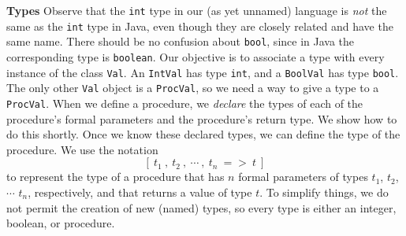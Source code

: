 \begin{minipage}[t]{\sw}
\slidenumber
\LARGE
{\bf Types}\exx
Observe that the \verb'int' type in our (as yet unnamed) language
is {\em not} the same as the \verb'int' type in Java,
even though they are closely related and have the same name.
There should be no confusion about \verb'bool', 
since in Java the corresponding type is \verb'boolean'.\exx
Our objective is to associate a type
with every instance of the class \verb'Val'.
An \verb'IntVal' has type \verb'int',
and a \verb'BoolVal' has type \verb'bool'.
The only other \verb'Val' object is a \verb'ProcVal',
so we need a way to give a type to a \verb'ProcVal'.\exx
When we define a procedure, we {\em declare} the types
of each of the procedure's formal parameters
and the procedure's return type.
We show how to do this shortly.
Once we know these declared types,
we can define the type of the procedure.\exx
We use the notation
\[ [\ t_1\ ,\ t_2\ ,\ \cdots\ ,\ t_n\ =>\ t\ ] \]
to represent the type of a procedure
that has $n$ formal parameters of types $t_1$, $t_2$, $\cdots$ $t_n$,
respectively, and that returns a value of type $t$.\exx
To simplify things, we do not permit the creation
of new (named) types,
so every type is either an integer, boolean, or procedure.
\end{minipage}
